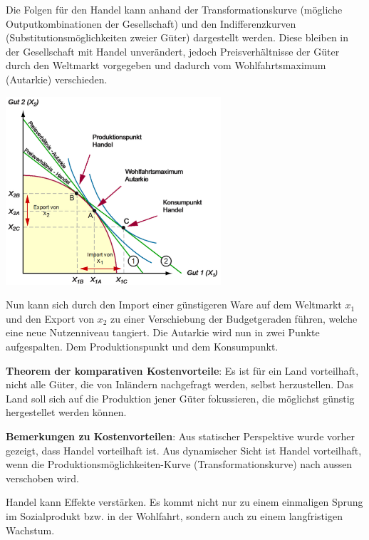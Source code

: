 \documentclass[9pt, landscape, fleqn]{scrartcl}
\begin{document}
\begin{multicols*}{3}
Die Folgen für den Handel kann anhand der Transformationskurve (mögliche Outputkombinationen der Gesellschaft) und den Indifferenzkurven (Substitutionsmöglichkeiten zweier Güter) dargestellt werden. Diese bleiben in der Gesellschaft mit Handel unverändert, jedoch Preisverhältnisse der Güter durch den Weltmarkt vorgegeben und dadurch vom Wohlfahrtsmaximum (Autarkie) verschieden. 

\begin{center}
    \includegraphics[width=8cm]{Wohlfahrtmaximum_Handel.png}
\end{center}

Nun kann sich durch den Import einer günstigeren Ware auf dem Weltmarkt $x_1$ und den Export von $x_2$ zu einer Verschiebung der Budgetgeraden führen, welche eine neue Nutzenniveau tangiert. Die Autarkie wird nun in zwei Punkte aufgespalten. Dem Produktionspunkt und dem Konsumpunkt. \newline

\textbf{Theorem der komparativen Kostenvorteile}: Es ist für ein Land vorteilhaft, nicht alle Güter, die von Inländern nachgefragt werden, selbst herzustellen. Das Land soll sich auf die Produktion jener Güter fokussieren, die möglichst günstig hergestellet werden können. \newline

\textbf{Bemerkungen zu Kostenvorteilen}: Aus statischer Perspektive wurde vorher gezeigt, dass Handel vorteilhaft ist. Aus dynamischer Sicht ist Handel vorteilhaft, wenn die Produktionsmöglichkeiten-Kurve (Transformationskurve) nach aussen verschoben wird. \newline

Handel kann Effekte verstärken. Es kommt nicht nur zu einem einmaligen Sprung im Sozialprodukt bzw. in der Wohlfahrt, sondern auch zu einem langfristigen Wachstum. \newline 


\end{multicols*}
\end{document}
